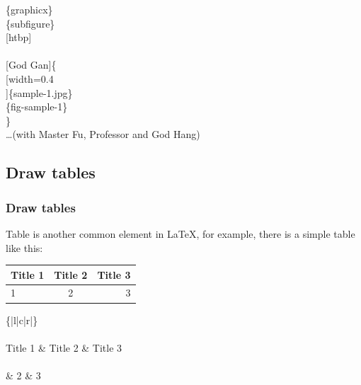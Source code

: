 \begin{frame}
\begin{minipage}{0.4\linewidth}
\begin{example}
\begin{figure}[htbp]
{					\label{fig-sample-4}
				}
			\end{figure}
		\end{example}
	\end{minipage}
	\hfill
		\begin{minipage}{0.55\linewidth}
			\{graphicx\}\\
			\{subfigure\}\\
			[htbp]\\
			\phantom{\qquad}\\
			\phantom{\qquad}\{\\
			\phantom{\qquad\qquad}[width=0.4\\
			]\{sample-1.jpg\}\\
			\phantom{\qquad\qquad}\{fig-sample-1\}\\
			\phantom{\qquad}\}\\
			\phantom{\qquad}\dots(with Master Fu, Professor and God Hang)\\
		\end{minipage}
\end{frame}

\subsection{Draw tables}

\begin{frame}
	\frametitle{Draw tables}
	Table is another common element in \LaTeX, for example, there is a simple table like this:
    \begin{example}
        \begin{tabular}{|l|c|r|}
        	\hline
        	Title 1 & Title 2 & Title 3 \\
        	\hline
        	1 & 2 &3 \\
        	\hline
        \end{tabular}
    \end{example}	
	\{|l|c|r|\}\\
	\qquad {}\\
	\qquad Title 1 \& Title 2 \& Title 3 \samplecommand{\textbackslash} \\
	\qquad {}\\
	 \& 2 \& 3 \samplecommand{\textbackslash} \\
	\qquad {}\\
\end{frame}

